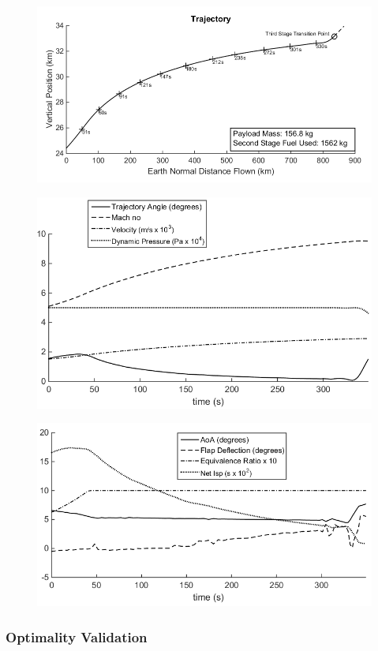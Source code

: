 \begin{figure}[ht]
\centering
\includegraphics[width=0.9\linewidth]{figures/5_Ascent/Constq}
\caption{}
\label{fig:Constq}
\end{figure}
\begin{figure}[ht]
\centering
\includegraphics[width=0.8\linewidth]{figures/5_Ascent/Constq-Aero}
\caption{}
\label{fig:Constq-Aero}
\end{figure}
\begin{figure}[ht]
\centering
\includegraphics[width=0.8\linewidth]{figures/5_Ascent/Constq-Vehicle}
\caption{}
\label{fig:Constq-Vehicle}
\end{figure}

\subsubsection{Optimality Validation}


